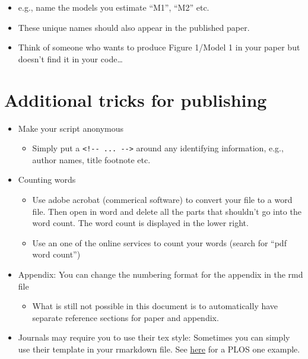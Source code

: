 \documentclass[
  12pt,
]{article}
\providecommand{\tightlist}{%
  \setlength{\itemsep}{0pt}\setlength{\parskip}{0pt}}
\begin{document}
\begin{itemize}
  \begin{itemize}
  \tightlist
  \item
    e.g., name the models you estimate ``M1'', ``M2'' etc.
  \item
    These unique names should also appear in the published paper.
  \item
    Think of someone who wants to produce Figure 1/Model 1 in your paper but doesn't find it in your code\ldots{}
  \end{itemize}
\end{itemize}

\hypertarget{additional-tricks-for-publishing}{%
\section{Additional tricks for publishing}\label{additional-tricks-for-publishing}}

\begin{itemize}
\tightlist
\item
  Make your script anonymous

  \begin{itemize}
  \tightlist
  \item
    Simply put a \texttt{\textless{}!-\/-\ ...\ -\/-\textgreater{}} around any identifying information, e.g., author names, title footnote etc.
  \end{itemize}
\item
  Counting words

  \begin{itemize}
  \tightlist
  \item
    Use adobe acrobat (commerical software) to convert your file to a word file. Then open in word and delete all the parts that shouldn't go into the word count. The word count is displayed in the lower right.
  \item
    Use an one of the online services to count your words (search for ``pdf word count'')
  \end{itemize}
\item
  Appendix: You can change the numbering format for the appendix in the rmd file

  \begin{itemize}
  \tightlist
  \item
    What is still not possible in this document is to automatically have separate reference sections for paper and appendix.
  \end{itemize}
\item
  Journals may require you to use their tex style: Sometimes you can simply use their template in your rmarkdown file. See \href{https://dataverse.harvard.edu/dataset.xhtml?persistentId=doi:10.7910/DVN/LDUMNY}{here} for a PLOS one example.
\end{itemize}
\end{document}
